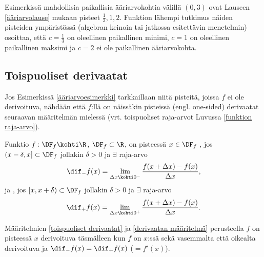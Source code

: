 Esimerkissä mahdollisia paikallisia ääriarvokohtia välillä $(0,3)$ ovat Lauseen 
\ref{ääriarvolause} mukaan pisteet $\tfrac{1}{3},1,2$. Funktion lähempi tutkimus näiden
pisteiden ympäristössä (algebran keinoin tai jatkossa esitettävin menetelmin) osoittaa, että
$c=\tfrac{1}{3}$ on oleellinen paikallinen minimi, $c=1$ on oleellinen paikallinen maksimi ja
$c=2$ ei ole paikallinen ääriarvokohta.

\subsection{Toispuoliset derivaatat}

Jos Esimerkissä \ref{ääriarvoesimerkki} tarkkaillaan niitä pisteitä, joissa $f$ ei ole 
derivoituva, nähdään että $f$:llä on näissäkin pisteissä  (engl. one-sided) 
derivaatat seuraavan määritelmän mielessä (vrt. toispuoliset raja-arvot Luvussa 
\ref{funktion raja-arvo}).
\begin{Def} \label{toispuoliset derivaatat} 
 
Funktio $f:\DF_f\kohti\R$, $\DF_f\subset\R$, on pisteessä $x\in\DF_f$
, jos $(x-\delta,x]\subset\DF_f$ jollakin $\delta>0$ ja $\exists$
raja-arvo
\[
\dif_-f(x)=\lim_{\Delta x\kohti 0^-} \frac{f(x+\Delta x)-f(x)}{\Delta x},
\]
ja , jos $[x,x+\delta)\subset\DF_f$ jollakin $\delta>0$ ja $\exists$ 
raja-arvo
\[
\dif_+f(x)=\lim_{\Delta x\kohti 0^+} \frac{f(x+\Delta x)-f(x)}{\Delta x}.
\]
\end{Def}
Määritelmien \ref{toispuoliset derivaatat} ja \ref{derivaatan määritelmä} perusteella $f$ on
pisteessä $x$ derivoituva täsmälleen kun $f$ on $x$:ssä sekä vasemmalta että oikealta
derivoituva ja $\dif_-f(x)=\dif_+f(x)$ ($=f'(x)$).

